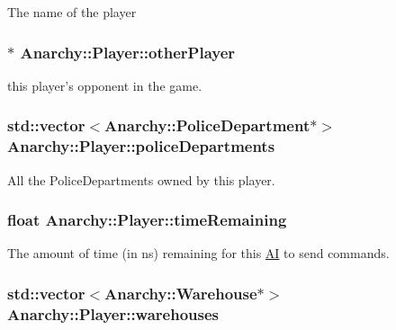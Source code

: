 The name of the player 

\hypertarget{classAnarchy_1_1Player_aa2cc74a91a193fb6ec24e28b3c78e2df}{
\subsubsection[{other\-Player}]{$\ast$ Anarchy\-::\-Player\-::other\-Player}}\label{classAnarchy_1_1Player_aa2cc74a91a193fb6ec24e28b3c78e2df}


this player's opponent in the game. 

\hypertarget{classAnarchy_1_1Player_a92ae92a6a0f6a491ec4ed9cd20cc598e}{
\subsubsection[{police\-Departments}]{\setlength{\rightskip}{0pt plus 5cm}std\-::vector$<${\bf Anarchy\-::\-Police\-Department}$\ast$$>$ Anarchy\-::\-Player\-::police\-Departments}}\label{classAnarchy_1_1Player_a92ae92a6a0f6a491ec4ed9cd20cc598e}


All the Police\-Departments owned by this player. 

\hypertarget{classAnarchy_1_1Player_a242266d4bd3c79253b01173be7db0db9}{
\subsubsection[{time\-Remaining}]{\setlength{\rightskip}{0pt plus 5cm}float Anarchy\-::\-Player\-::time\-Remaining}}\label{classAnarchy_1_1Player_a242266d4bd3c79253b01173be7db0db9}


The amount of time (in ns) remaining for this \hyperlink{classAnarchy_1_1AI}{A\-I} to send commands. 

\hypertarget{classAnarchy_1_1Player_ae2913affe60c619b4b7d25475f677804}{
\subsubsection[{warehouses}]{\setlength{\rightskip}{0pt plus 5cm}std\-::vector$<${\bf Anarchy\-::\-Warehouse}$\ast$$>$ Anarchy\-::\-Player\-::warehouses}}\label{classAnarchy_1_1Player_ae2913affe60c619b4b7d25475f677804}


